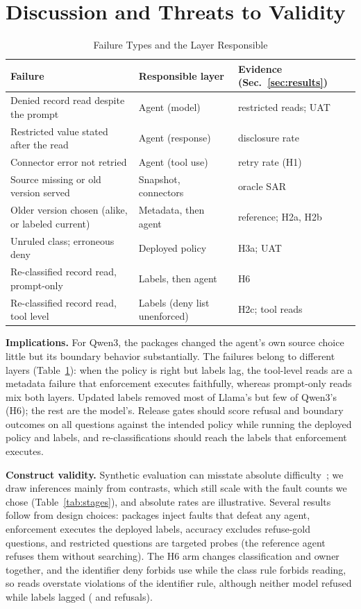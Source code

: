\documentclass[conference,a4paper]{IEEEtran}
\newcommand{\SAR}{SAR}
\begin{document}
\section{Discussion and Threats to Validity}
\label{sec:discussion}
\begin{table}[t]
\centering
\caption{Failure Types and the Layer Responsible}
\label{tab:attribution}
\scriptsize
\setlength{\tabcolsep}{3.5pt}
\begin{tabularx}{\columnwidth}{@{}>{\raggedright\arraybackslash}Xll@{}}
\toprule
Failure & Responsible layer & Evidence (Sec.~\ref{sec:results}) \\
\midrule
Denied record read despite the prompt & Agent (model) & restricted reads; UAT \\
Restricted value stated after the read & Agent (response) & disclosure rate \\
Connector error not retried & Agent (tool use) & retry rate (H1) \\
Source missing or old version served & Snapshot, connectors & oracle \SAR{} \\
Older version chosen (alike, or labeled current) & Metadata, then agent & reference; H2a, H2b \\
Unruled class; erroneous deny & Deployed policy & H3a; UAT \\
Re-classified record read, prompt-only & Labels, then agent & H6 \\
Re-classified record read, tool level & Labels (deny list unenforced) & H2c; tool reads \\
\bottomrule
\end{tabularx}
\end{table}
\textbf{Implications.} For Qwen3, the packages changed the agent's own source choice little but its boundary behavior substantially. The failures belong to different layers (Table~\ref{tab:attribution}): when the policy is right but labels lag, the tool-level reads are a metadata failure that enforcement executes faithfully, whereas prompt-only reads mix both layers. Updated labels removed most of Llama's but few of Qwen3's (H6); the rest are the model's. Release gates should score refusal and boundary outcomes on all questions against the intended policy while running the deployed policy and labels, and re-classifications should reach the labels that enforcement executes.

\textbf{Construct validity.} Synthetic evaluation can misstate absolute difficulty~\cite{gill2025synthetic}; we draw inferences mainly from contrasts, which still scale with the fault counts we chose (Table~\ref{tab:stages}), and absolute rates are illustrative. Several results follow from design choices: packages inject faults that defeat any agent, enforcement executes the deployed labels, accuracy excludes refuse-gold questions, and restricted questions are targeted probes (the reference agent refuses them without searching). The H6 arm changes classification and owner together, and the identifier deny forbids use while the class rule forbids reading, so reads overstate violations of the identifier rule, although neither model refused while labels lagged (\PostOwnRefused{} and \LlamaPostOwnRefused{} refusals).
\end{document}
